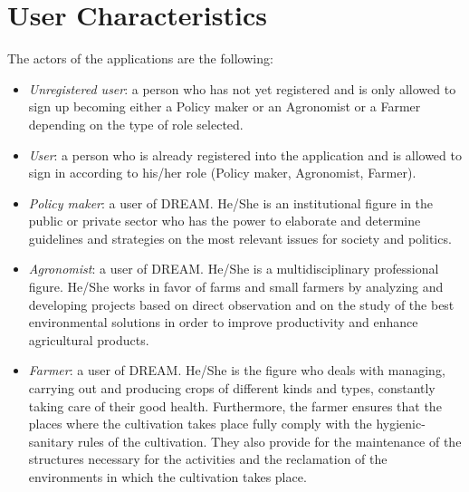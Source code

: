 \section{User Characteristics}
The actors of the applications are the following:
\begin{itemize}
    \item \textit {Unregistered user}: a person who has not yet registered and is only allowed to sign up becoming either a Policy maker or an Agronomist or a Farmer depending on the type of role selected.
    \item \textit {User}: a person who is already registered into the application and is allowed to sign in according to his/her role (Policy maker, Agronomist, Farmer).
    \item \textit {Policy maker}: a user of DREAM. He/She is an institutional figure in the public or private sector who has the power to elaborate and determine guidelines and strategies on the most relevant issues for society and politics. 
    \item \textit {Agronomist}: a user of DREAM. He/She is a multidisciplinary professional figure. He/She works in favor of farms and small farmers by analyzing and developing projects based on direct observation and on the study of the best environmental solutions in order to improve productivity and enhance agricultural products.
    \item \textit {Farmer}: a user of DREAM. He/She is the figure who deals with managing, carrying out and producing crops of different kinds and types, constantly taking care of their good health. Furthermore, the farmer ensures that the places where the cultivation takes place fully comply with the hygienic-sanitary rules of the cultivation. They also provide for the maintenance of the structures necessary for the activities and the reclamation of the environments in which the cultivation takes place.

\end{itemize}